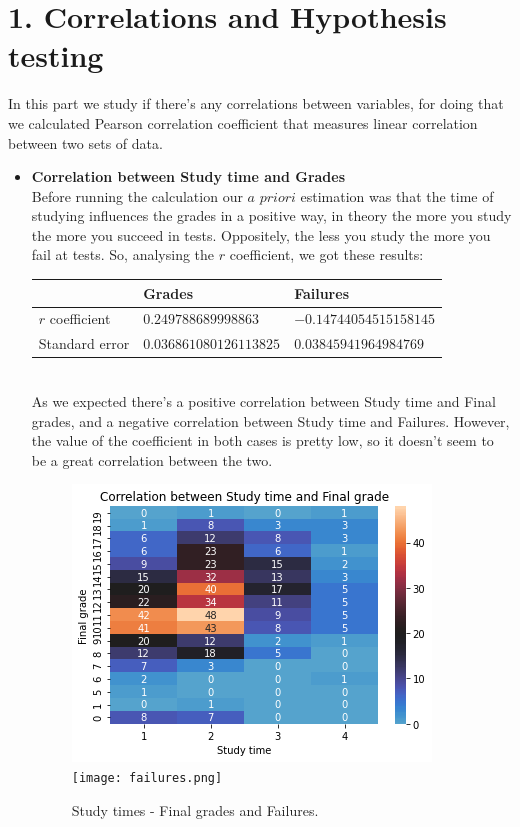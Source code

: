 \documentclass[a4paper, 11pt]{report}
\theoremstyle{definition}
\numberwithin{equation}{section}		%
\numberwithin{figure}{section}			%
\numberwithin{table}{section}				%
\begin{document}
\section*{1. Correlations and Hypothesis testing}
In this part we study if there's any correlations between variables, for doing that we calculated Pearson correlation coefficient that measures linear correlation between two sets of data.

\begin{itemize}
\item \textbf{Correlation between Study time and Grades}
\\Before running the calculation our $a$ $priori$ estimation was that the time of studying influences the grades in a positive way, in theory the more you study the more you succeed in tests. Oppositely, the less you study the more you fail at tests. So, analysing the $r$ coefficient, we got these results:
\begin{center}
\begin{tabular}{|p{3cm}|p{4cm}|p{4cm}|}
 & Grades & Failures\\
\hline
$r$ coefficient & $0.249788689998863$ & $-0.14744054515158145$\\
\hline
Standard error & $0.036861080126113825$ & $0.03845941964984769$\\
\hline
\end{tabular}
\end{center}

\\As we expected there's a positive correlation between Study time and Final grades, and a negative correlation between Study time and Failures. However, the value of the coefficient in both cases is pretty low, so it doesn't seem to be a great correlation between the two. 

\begin{figure}[h]\centering
\includegraphics[scale=0.42]{g3-st.png}\quad\texttt{[image: failures.png]}
\caption{Study times - Final grades and Failures.}
\end{figure}


\end{itemize}
\end{document}
